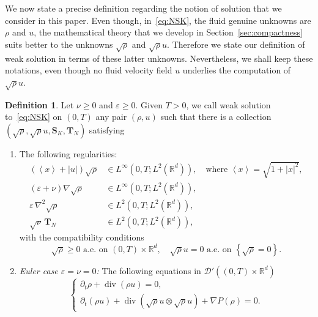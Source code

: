 \documentclass[11pt]{article}
\theoremstyle{definition}
\newtheorem{defi}[theo]{Definition}
\numberwithin{equation}{section}
\numberwithin{figure}{section}
\numberwithin{table}{section}
\DeclareMathOperator{\DIV}{div}
\newcommand*\R{\mathbb{R}}
\newcommand*\<{\left\langle}
\renewcommand*\>{\right\rangle}
\renewcommand*\ge{\geqslant}
\newcommand*\eps{\varepsilon}
\begin{document}
We now state a precise definition regarding the notion of solution that we consider in this paper. Even though, in~\eqref{eq:NSK}, the fluid genuine unknowns are $\rho$ and $u$, the mathematical theory that we develop in Section~\ref{sec:compactness} suits better to the unknowns $\sqrt{\rho}$ and $\sqrt{\rho}u$. Therefore we state our definition of weak solution in terms of these latter unknowns. Nevertheless, we shall keep these notations, even though no fluid velocity field $u$ underlies the computation of $\sqrt{\rho}u.$

\begin{defi}\label{def:weaksol-minus}
Let $\nu \ge 0$ and $\varepsilon \ge 0.$ Given $T >0$, we call weak solution to~\eqref{eq:NSK} on $(0,T)$ any pair $(\rho,u)$ such that there is a collection $(\sqrt{\rho},\sqrt{\rho}u,\mathbf S_{K},\mathbf T_{N})$ satisfying
\begin{enumerate}
\item \label{2.1.1} The following regularities:
\begin{align*}
\left(\<x\> +|u|\right)\sqrt{\rho} &\in L^{\infty}\left(0,T; L^2 (\R^d)\right),\quad \text{where }\<x\> =\sqrt{1+|x|^2}, \\
(\eps+\nu)\nabla \sqrt \rho &\in L^{\infty}\left(0,T; L^2 (\R^d)\right),\\
\varepsilon \, \nabla^2 \sqrt{\rho} &\in L^2(0,T;L^2(\mathbb R^d)),\\
\sqrt \nu \, \mathbf T_N &\in L^2(0,T; L^2(\mathbb R^d)),
\end{align*}
with the compatibility conditions
\[
\sqrt{\rho} \ge 0 \text{ a.e. on } (0,T)\times \R^d, \quad \sqrt{\rho}u= 0 \text{ a.e. on } \left\{\sqrt{\rho} = 0\right\}.
\]

\item \label{2.1.2} \emph{Euler case $\eps=\nu=0$:} The following equations in $\mathcal D'((0,T)\times \mathbb R^d)$
\begin{equation}\label{eq:NSKminus-bis-euler}
\begin{cases}
\partial_t{\rho}+\DIV ({\rho} u)= 0,\\
\partial_t ({\rho}u) +\DIV (\sqrt{\rho}u \otimes \sqrt{\rho}u) + \nabla P(\rho) =0.
\end{cases}
\end{equation}


\end{enumerate}
\end{defi}
\end{document}

